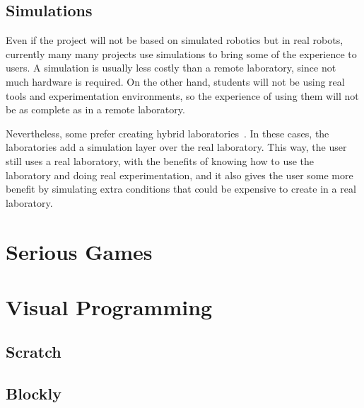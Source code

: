 
\subsection{Simulations}

Even if the project will not be based on simulated robotics but in real robots, currently many
many projects use simulations to bring some of the experience to users. A simulation is usually
less costly than a remote laboratory, since not much hardware is required. On the other hand,
students will not be using real tools and experimentation environments, so the experience of using
them will not be as complete as in a remote laboratory.

Nevertheless, some prefer creating hybrid laboratories~\cite{hybrid_labs}. In these cases, the
laboratories add a simulation layer over the real laboratory. This way, the user still uses a real
laboratory, with the benefits of knowing how to use the laboratory and doing real experimentation,
and it also gives the user some more benefit by simulating extra conditions that could be expensive
to create in a real laboratory.

\section{Serious Games}

\section{Visual Programming}

\subsection{Scratch}

\subsection{Blockly}
